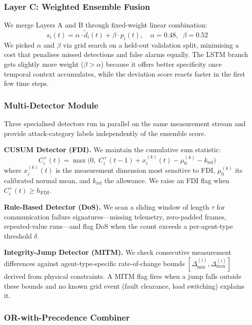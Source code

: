 \documentclass[conference]{IEEEtran}
\begin{document}
\subsubsection{Layer C: Weighted Ensemble Fusion}

We merge Layers A and B through fixed-weight linear combination:
\begin{equation}
s_i(t) = \alpha \cdot \tilde{d}_i(t) + \beta \cdot p_i(t), \quad \alpha = 0.48,\;\; \beta = 0.52
\label{eq:ensemble}
\end{equation}
We picked $\alpha$ and $\beta$ via grid search on a held-out validation split, minimising a cost that penalises missed detections and false alarms equally. The LSTM branch gets slightly more weight ($\beta > \alpha$) because it offers better specificity once temporal context accumulates, while the deviation score reacts faster in the first few time steps.

\subsubsection{Multi-Detector Module}

Three specialised detectors run in parallel on the same measurement stream and provide attack-category labels independently of the ensemble score.

\textbf{CUSUM Detector (FDI).} We maintain the cumulative sum statistic:
\begin{equation}
C_i^+(t) = \max\!\bigl(0,\; C_i^+(t{-}1) + x_i^{(k)}(t) - \mu_0^{(k)} - k_{\text{ref}}\bigr)
\label{eq:cusum}
\end{equation}
where $x_i^{(k)}(t)$ is the measurement dimension most sensitive to FDI, $\mu_0^{(k)}$ its calibrated normal mean, and $k_{\text{ref}}$ the allowance. We raise an FDI flag when $C_i^+(t) \geq h_{\text{FDI}}$.

\textbf{Rule-Based Detector (DoS).} We scan a sliding window of length $\tau$ for communication failure signatures---missing telemetry, zero-padded frames, repeated-value runs---and flag DoS when the count exceeds a per-agent-type threshold $\delta$.

\textbf{Integrity-Jump Detector (MITM).} We check consecutive measurement differences against agent-type-specific rate-of-change bounds $[\Delta_{\min}^{(i)}, \Delta_{\max}^{(i)}]$ derived from physical constraints. A MITM flag fires when a jump falls outside these bounds and no known grid event (fault clearance, load switching) explains it.

\subsubsection{OR-with-Precedence Combiner}
\end{document}
